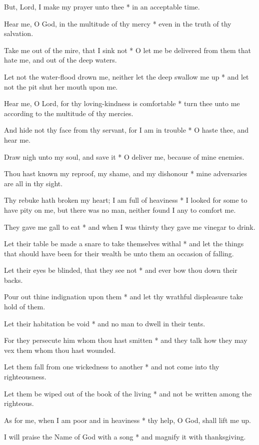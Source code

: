 But, Lord, I make my prayer unto thee * in an acceptable time.

Hear me, O God, in the multitude of thy mercy * even in the truth of thy salvation.

Take me out of the mire, that I sink not * O let me be delivered from them that hate me, and out of the deep waters.

Let not the water-flood drown me, neither let the deep swallow me up * and let not the pit shut her mouth upon me.

Hear me, O Lord, for thy loving-kindness is comfortable * turn thee unto me according to the multitude of thy mercies.

And hide not thy face from thy servant, for I am in trouble * O haste thee, and hear me.

Draw nigh unto my soul, and save it * O deliver me, because of mine enemies.

Thou hast known my reproof, my shame, and my dishonour * mine adversaries are all in thy sight.

Thy rebuke hath broken my heart; I am full of heaviness * I looked for some to have pity on me, but there was no man, neither found I any to comfort me.

They gave me gall to eat * and when I was thirsty they gave me vinegar to drink.

Let their table be made a snare to take themselves withal * and let the things that should have been for their wealth be unto them an occasion of falling.

Let their eyes be blinded, that they see not * and ever bow thou down their backs.

Pour out thine indignation upon them * and let thy wrathful displeasure take hold of them.

Let their habitation be void * and no man to dwell in their tents.

For they persecute him whom thou hast smitten * and they talk how they may vex them whom thou hast wounded.

Let them fall from one wickedness to another * and not come into thy righteousness.

Let them be wiped out of the book of the living * and not be written among the righteous.

As for me, when I am poor and in heaviness * thy help, O God, shall lift me up.

I will praise the Name of God with a song * and magnify it with thanksgiving.


